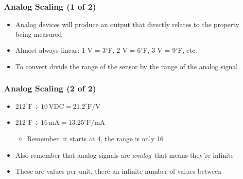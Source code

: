 \begin{frame}
    \frametitle{Analog Scaling (1 of 2)}

    \begin{itemize}
        \item Analog devices will produce an output that directly relates to the property being measured
        \item Almost always linear: 1 V = 3$^\circ$F, 2 V = 6$^\circ$F, 3 V = 9$^\circ$F, etc.
        \item To convert divide the range of the sensor by the range of the analog signal
    \end{itemize}
\end{frame}

\begin{frame}
    \frametitle{Analog Scaling (2 of 2)}

    \begin{itemize}
        \item $212^\circ\text{F} \div 10\,\text{VDC}=21.2^\circ \text{F/V}$
        \item $212^\circ\text{F} \div 16\,\text{mA}=13.25^\circ \text{F/mA}$
        \begin{itemize}
            \item Remember, it starts at 4, the range is only 16
        \end{itemize}
        \item Also remember that analog signals are \emph{analog}--that means they're infinite
        \item These are values per unit, there an infinite number of values between
    \end{itemize}
\end{frame}

